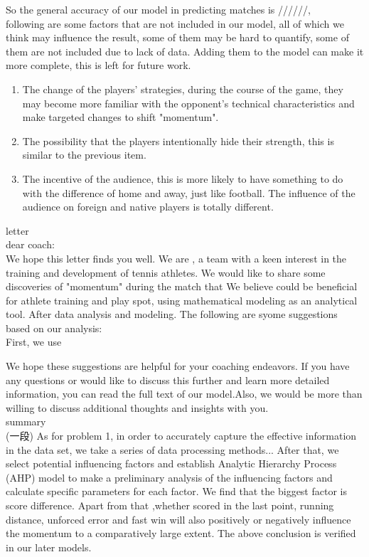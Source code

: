 \documentclass[12pt, a4paper, oneside]{article}
\theoremstyle{break}
\begin{document}
So the general accuracy of our model in predicting matches is //////, \\
following are some factors that are not included in our model, 
all of which we think may influence the result, some of them may be hard to quantify, some of them are not included due to lack
of data. Adding them to the model can make it more complete, this is left for future work.
\begin{enumerate}
    \item The change of the players' strategies, during the course of the game, they may become more 
    familiar with the opponent's technical characteristics and make targeted changes to shift "momentum".
    \item The possibility that the players intentionally hide their strength, this is similar to the previous item.
    \item The incentive of the audience, this is more likely to have something to do with the difference of home and away,
    just like football. The influence of the audience on foreign and native players is totally different.
\end{enumerate}

letter\\
dear coach:\\

We hope this letter finds you well. We are , a team with a keen interest in the training and development of tennis 
athletes. We would like to share some discoveries of "momentum" during the match that We believe could be beneficial 
for athlete training and play spot, using mathematical modeling as an analytical tool. After data analysis and modeling. 
The following are syome suggestions based on our analysis:\\

First, we use


We hope these suggestions are helpful for your coaching endeavors. 
If you have any questions or would like to discuss this further and learn more detailed information, 
you can read the full text of our model.Also, we would be more
 than willing to discuss additional thoughts and insights with you.\\


summary\\
(一段)
As for problem 1,  in order to accurately capture the effective information in the data 
set, we take a series of data processing methods... After that, we select potential influencing
factors and establish Analytic Hierarchy Process (AHP) model to make a preliminary analysis of the influencing
factors and calculate specific parameters for each factor. We find that the biggest factor is 
score difference. Apart from that ,whether scored in the last point, running distance, unforced error and fast win
will also positively or negatively influence the momentum to a comparatively large extent. The above conclusion is verified
in our later models.\\
\end{document}
